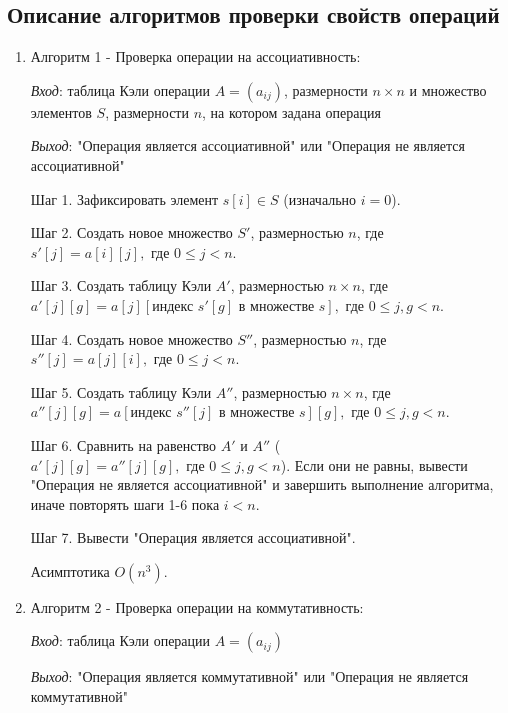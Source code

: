\documentclass[spec, och, labwork]{shiza}
\begin{document}
\subsection{Описание алгоритмов проверки свойств операций}
            \begin{enumerate}
                \item Алгоритм 1 - Проверка операции на ассоциативность:
                
                \textit{Вход}: таблица Кэли операции $A = (a_{ij})$, размерности $n \times n$ и множество элементов $S$, размерности $n$, на котором задана операция

                \textit{Выход}: "Операция является ассоциативной" или "Операция не является ассоциативной"

                Шаг 1. Зафиксировать элемент $s[i] \in S$ (изначально $i = 0$).

                Шаг 2. Создать новое множество $S'$, размерностью $n$, где $s'[j] = a[i][j], \text{ где } 0 \leq j < n$.

                Шаг 3. Создать таблицу Кэли $A'$, размерностью $n \times n$, где $a'[j][g] = a[j][\text{индекс }s'[g] \text{ в множестве } s], \text{ где } 0 \leq j, g < n$.

                Шаг 4. Создать новое множество $S''$, размерностью $n$, где $s''[j] = a[j][i], \text{ где } 0 \leq j < n$.

                Шаг 5. Создать таблицу Кэли $A''$, размерностью $n \times n$, где $a''[j][g] = a[\text{индекс }s''[j] \text{ в множестве } s][g], \text{ где } 0 \leq j, g < n$.

                Шаг 6. Сравнить на равенство $A'$ и $A''$ ($a'[j][g] = a''[j][g], \text{ где } 0 \leq j, g < n$). Если они не равны, вывести "Операция не является ассоциативной" и завершить выполнение алгоритма,
                иначе повторять шаги 1-6 пока $i < n$.

                Шаг 7. Вывести "Операция является ассоциативной".

                Асимптотика $O(n^3)$.

                \item Алгоритм 2 - Проверка операции на коммутативность:
                
                \textit{Вход}: таблица Кэли операции $A = (a_{ij})$

                \textit{Выход}: "Операция является коммутативной" или "Операция не является коммутативной"


\end{enumerate}
\end{document}
